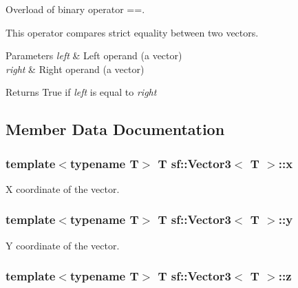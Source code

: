 Overload of binary operator ==. 

This operator compares strict equality between two vectors.


\begin{DoxyParams}{Parameters}
{\em left} & Left operand (a vector) \\
\hline
{\em right} & Right operand (a vector)\\
\hline
\end{DoxyParams}
\begin{DoxyReturn}{Returns}
True if {\itshape left} is equal to {\itshape right} 
\end{DoxyReturn}


\subsection{Member Data Documentation}
\hypertarget{classsf_1_1_vector3_a3cb0c769390bc37c346bb1a69e510d16}{
\subsubsection[{x}]{\setlength{\rightskip}{0pt plus 5cm}template$<$typename T$>$ {\bf T} {\bf sf\-::\-Vector3}$<$ {\bf T} $>$\-::x}}\label{classsf_1_1_vector3_a3cb0c769390bc37c346bb1a69e510d16}


X coordinate of the vector. 

\hypertarget{classsf_1_1_vector3_a6590d50ccb862c5efc5512e974e9b794}{
\subsubsection[{y}]{\setlength{\rightskip}{0pt plus 5cm}template$<$typename T$>$ {\bf T} {\bf sf\-::\-Vector3}$<$ {\bf T} $>$\-::y}}\label{classsf_1_1_vector3_a6590d50ccb862c5efc5512e974e9b794}


Y coordinate of the vector. 

\hypertarget{classsf_1_1_vector3_a2f36ab4b552c028e3a9734c1ad4df7d1}{
\subsubsection[{z}]{\setlength{\rightskip}{0pt plus 5cm}template$<$typename T$>$ {\bf T} {\bf sf\-::\-Vector3}$<$ {\bf T} $>$\-::z}}\label{classsf_1_1_vector3_a2f36ab4b552c028e3a9734c1ad4df7d1}


